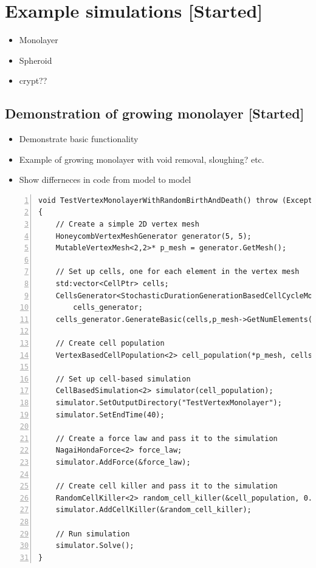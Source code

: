 \documentclass[a4paper,12pt]{article}
\newcommand{\todo}{[Started]}
\begin{document}
\section{Example simulations \todo} \label{sec:example_simulations}
\begin{itemize}
  \item Monolayer
  \item Spheroid 
  \item crypt??
\end{itemize}

\subsection{Demonstration of growing monolayer \todo} \label{sec:growing_domain}
\begin{itemize}
  \item Demonstrate basic functionality
  \item Example of growing monolayer with void removal, sloughing? etc. 
  \item Show differneces in code from model to model
\end{itemize}
\begin{small}
\begin{Verbatim}[frame=single, numbers=left, numbersep=2pt]
void TestVertexMonolayerWithRandomBirthAndDeath() throw (Exception)
{
    // Create a simple 2D vertex mesh
    HoneycombVertexMeshGenerator generator(5, 5);
    MutableVertexMesh<2,2>* p_mesh = generator.GetMesh();

    // Set up cells, one for each element in the vertex mesh
    std:vector<CellPtr> cells;
    CellsGenerator<StochasticDurationGenerationBasedCellCycleModel, 2>
        cells_generator;
    cells_generator.GenerateBasic(cells,p_mesh->GetNumElements());

    // Create cell population
    VertexBasedCellPopulation<2> cell_population(*p_mesh, cells);

    // Set up cell-based simulation
    CellBasedSimulation<2> simulator(cell_population);
    simulator.SetOutputDirectory("TestVertexMonolayer");
    simulator.SetEndTime(40);

    // Create a force law and pass it to the simulation
    NagaiHondaForce<2> force_law;
    simulator.AddForce(&force_law);

    // Create cell killer and pass it to the simulation
    RandomCellKiller<2> random_cell_killer(&cell_population, 0.01);
    simulator.AddCellKiller(&random_cell_killer);

    // Run simulation
    simulator.Solve();
}
\end{Verbatim}
\end{small}
\end{document}
